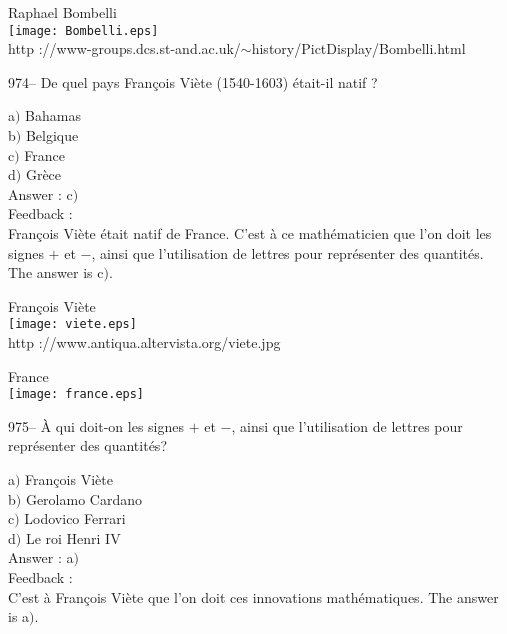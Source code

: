 \documentclass[letterpaper, 12pt]{article}
\begin{document}
        \begin{center}
        Raphael Bombelli\\
    \texttt{[image: Bombelli.eps]}\\
        {\footnotesize http
://www-groups.dcs.st-and.ac.uk/$\sim$history/PictDisplay/Bombelli.html}
    \end{center}

974-- De quel pays Fran\c cois Vi\`ete (1540-1603) \'etait-il natif
?

a$)$ Bahamas \\
b$)$ Belgique  \\
c$)$ France  \\
d$)$ Gr\`ece\\

Answer : c$)$\\

Feedback : \\
Fran\c cois Vi\`ete \'etait natif de France. C'est \`a ce
math\'ematicien que l'on doit les signes $+$ et $-$, ainsi que
l'utilisation de lettres
pour repr\'esenter des quantit\'es. The answer is c$)$.\\

        \begin{center}
        Fran\c cois Vi\`ete\\
    \texttt{[image: viete.eps]}\\
        {\footnotesize http ://www.antiqua.altervista.org/viete.jpg}
    \end{center}

        \begin{center}
        France\\
    \texttt{[image: france.eps]}\\
    \end{center}

975-- \`A qui doit-on les signes $+$ et $-$, ainsi que l'utilisation
de lettres pour repr\'esenter des quantit\'es?

a$)$ Fran\c cois Vi\`ete \\
b$)$ Gerolamo Cardano  \\
c$)$ Lodovico Ferrari  \\
d$)$ Le roi Henri IV\\

Answer : a$)$\\

Feedback : \\
C'est \`a Fran\c cois Vi\`ete que l'on doit ces innovations
math\'ematiques. The answer is a$)$.
\end{document}
